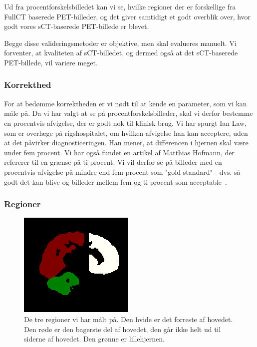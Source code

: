 Ud fra procentforskelsbilledet kan vi se, hvilke regioner der er forskellige fra FullCT baserede PET-billeder, og det giver samtidigt et godt overblik over, hvor godt vores sCT-baserede PET-billede er blevet.

Begge disse valideringsmetoder er objektive, men skal evalueres manuelt. Vi forventer, at kvaliteten af sCT-billedet, og dermed også at det sCT-baserede PET-billede, vil variere meget.

\subsubsection{Korrekthed}

For at bedømme korrektheden er vi nødt til at kende en parameter, som vi kan måle på. Da vi har valgt at se på procentforskelsbilleder, skal vi
derfor bestemme en procentvis afvigelse, der er godt nok til klinisk brug.
Vi har spurgt Ian Law, som er overlæge på rigshospitalet, om hvilken afvigelse
han kan acceptere, uden at det påvirker diagnosticeringen. Han mener, at
differencen i hjernen skal være under fem procent. Vi har også fundet en
artikel af Matthias Hofmann, der refererer til en grænse på ti procent. Vi
vil derfor se på billeder med en procentvis afvigelse på mindre end fem
procent som "gold standard" - dvs. så godt det kan blive og billeder
mellem fem og ti procent som acceptable~\cite{accepteretAfvigelse}.

\subsubsection{Regioner}

\begin{figure}
   \includegraphics[width=\textwidth]{billeder/masks.png}
   \caption{De tre regioner vi har målt på. Den hvide er det forreste af hovedet. Den røde er den bagerste del af hovedet, den går ikke helt ud til siderne af hovedet. Den grønne er lillehjernen.}
   \label{sct_problemer}
\end{figure}


